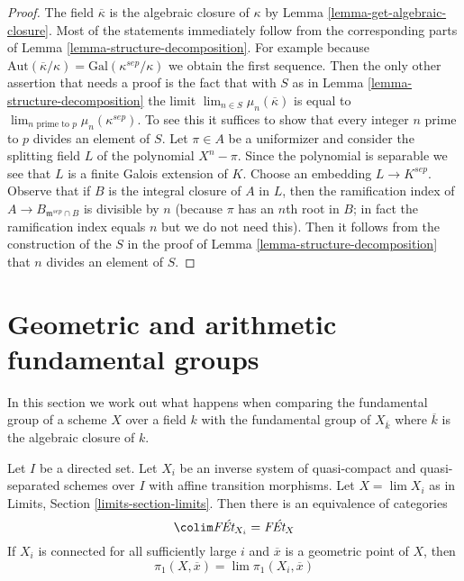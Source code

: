\begin{proof}
The field $\overline{\kappa}$ is the algebraic closure of $\kappa$ by
Lemma \ref{lemma-get-algebraic-closure}.
Most of the statements immediately follow from the corresponding
parts of Lemma \ref{lemma-structure-decomposition}. For example because
$\text{Aut}(\overline{\kappa}/\kappa) = \text{Gal}(\kappa^{sep}/\kappa)$
we obtain the first sequence.
Then the only other assertion that needs a proof is the fact that
with $S$ as in Lemma \ref{lemma-structure-decomposition} the
limit $\lim_{n \in S} \mu_n(\overline{\kappa})$ is equal to
$\lim_{n\text{ prime to }p} \mu_n(\kappa^{sep})$. To see this
it suffices to show that every integer $n$ prime to $p$
divides an element of $S$.
Let $\pi \in A$ be a uniformizer and consider the splitting
field $L$ of the polynomial $X^n - \pi$. Since the polynomial
is separable we see that $L$ is a finite Galois extension of $K$.
Choose an embedding $L \to K^{sep}$.
Observe that if $B$ is the integral closure of $A$ in $L$,
then the ramification index of $A \to B_{\mathfrak m^{sep} \cap B}$
is divisible by $n$ (because $\pi$ has an $n$th root in $B$; in fact
the ramification index equals $n$ but we do not need this).
Then it follows from the construction of the $S$ in the proof of
Lemma \ref{lemma-structure-decomposition}
that $n$ divides an element of $S$.
\end{proof}








\section{Geometric and arithmetic fundamental groups}
\label{section-galois-action}

\noindent
In this section we work out what happens when comparing the
fundamental group of a scheme $X$ over a field $k$ with the
fundamental group of $X_{\overline{k}}$ where $\overline{k}$
is the algebraic closure of $k$.

\begin{lemma}
\label{lemma-limit}
Let $I$ be a directed set. Let $X_i$ be an
inverse system of quasi-compact and quasi-separated schemes
over $I$ with affine transition morphisms.
Let $X = \lim X_i$ as in Limits, Section \ref{limits-section-limits}.
Then there is an equivalence of categories
$$
\colim \textit{F\'Et}_{X_i} = \textit{F\'Et}_X
$$
If $X_i$ is connected for all sufficiently large $i$ and $\overline{x}$
is a geometric point of $X$, then
$$
\pi_1(X, \overline{x}) = \lim \pi_1(X_i, \overline{x})
$$
\end{lemma}

